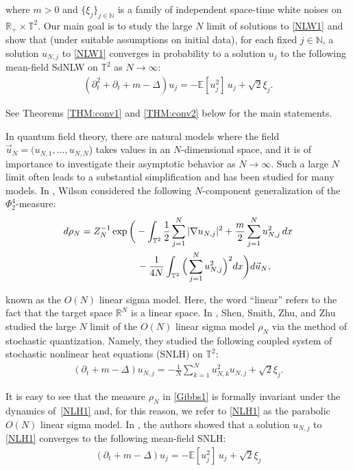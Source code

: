 \documentclass[letterpaper, 11pt,  reqno]{amsart}
\newcommand{\1}{\hspace{0.5mm}\text{I}\hspace{0.2mm}}
\newcommand{\noi}{\noindent}
\newcommand{\R}{\mathbb{R}}
\newcommand{\T}{\mathbb{T}}
\newcommand{\N}{\mathbb{N}}
\newcommand{\E}{\mathbb{E}}
\newcommand{\Dl}{\Delta}
\newcommand{\dt}{\partial_t}
\newcommand{\nb}{\nabla}
\numberwithin{equation}{section}
\numberwithin{theorem}{section}
\begin{document}
\noi
where $m > 0$ and $\{\xi_j\}_{j \in \N}$ is a family of  independent space-time white noises on 
$\R_+ \times \T^2$.
Our main goal is to 
study the large $N$ limit of solutions to \eqref{NLW1}
and show that (under suitable assumptions on initial data), for each fixed $j \in \N$, 
 a solution $u_{N, j}$ to \eqref{NLW1}
 converges in probability to a solution  $u_j$  to the following mean-field SdNLW on $\T^2$
 as $N \to \infty$:
\begin{align}
    (\dt^2 + \dt + m - \Dl) u_j = - \E [ u_j^2 ] \,u_j + \sqrt{2} \xi_j.
\label{MF1}
\end{align}


\noi
See
Theorems \ref{THM:conv1}
and \ref{THM:conv2} below for the main statements.


In quantum field theory, there are natural  models where the field $\vec u_N = (u_{N, 1}, \dots, u_{N, N}$) takes values in an
$N$-dimensional space, 
and it is of importance to investigate
their asymptotic  behavior as $N \to \infty$.
Such a large $N$ limit often
leads to 
a substantial 
simplification and has been studied for many models.
In \cite{Wilson}, 
Wilson considered the following
$N$-component generalization of the $\Phi^4_2$-measure:
\begin{align}
\begin{split}
d \rho_N  
= Z_N^{-1} & \exp \bigg( - \int_{\T^2} \frac 12 \sum_{j = 1}^N |\nb u_{N, j}|^2 
+ \frac{m}{2} \sum_{j = 1}^N u_{N, j}^2 \,dx \\
& \hphantom{XXX}- \frac{1}{4N} \int_{\T^2} \Big( \sum_{j = 1}^N u_{N, j}^2 \Big)^2 dx \bigg) 
    d \vec u_N, 
\end{split}
\label{Gibbs1}
\end{align}

\noi
known as
 the $O (N)$ linear sigma model.
 Here,  the word ``linear'' refers to the fact that the target space $\R^N$ is a linear space.
In \cite{SSZZ}, Shen, Smith, Zhu, and Zhu
studied the large $N$ limit
of the $O (N)$ linear sigma model $\rho_N$
via the method of stochastic quantization.
Namely, they studied the following
 coupled system of stochastic nonlinear heat equations (SNLH) on $\T^2$:
\begin{align}
    (\dt + m - \Dl) u_{N, j} = - \frac{1}{N} \sum_{k = 1}^N u_{N, k}^2 u_{N, j} + \sqrt{2} \xi_j.
\label{NLH1}
\end{align}

\noi
It is easy to see that 
 the measure $\rho_N$
 in \eqref{Gibbs1} is 
formally invariant under the dynamics
of~\eqref{NLH1} 
and, for this reason, 
we refer to \eqref{NLH1}
as the parabolic $O(N)$ linear sigma model.
In \cite{SSZZ},
the authors 
 showed that a solution $u_{N, j}$ to \eqref{NLH1} converges
to the following mean-field SNLH:
\begin{align}
    (\dt + m - \Dl) u_j = - \E [ u_j^2 ] \,u_j + \sqrt{2} \xi_j
\label{NLH2}
\end{align}
\end{document}
